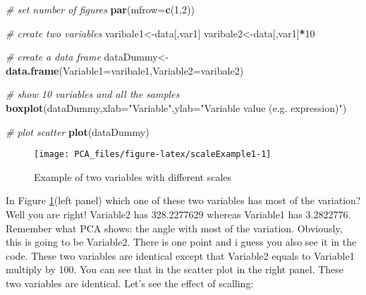 \documentclass[
]{book}
\newenvironment{Shaded}{\begin{snugshade}}{\end{snugshade}}
\newcommand{\CommentTok}[1]{\textcolor[rgb]{0.56,0.35,0.01}{\textit{#1}}}
\newcommand{\DataTypeTok}[1]{\textcolor[rgb]{0.13,0.29,0.53}{#1}}
\newcommand{\DecValTok}[1]{\textcolor[rgb]{0.00,0.00,0.81}{#1}}
\newcommand{\KeywordTok}[1]{\textcolor[rgb]{0.13,0.29,0.53}{\textbf{#1}}}
\newcommand{\NormalTok}[1]{#1}
\newcommand{\OperatorTok}[1]{\textcolor[rgb]{0.81,0.36,0.00}{\textbf{#1}}}
\newcommand{\StringTok}[1]{\textcolor[rgb]{0.31,0.60,0.02}{#1}}
\theoremstyle{definition}
\theoremstyle{definition}
\theoremstyle{definition}
\theoremstyle{remark}
\begin{document}
\begin{Shaded}
\begin{Highlighting}[]
\CommentTok{# set number of figures}
\KeywordTok{par}\NormalTok{(}\DataTypeTok{mfrow=}\KeywordTok{c}\NormalTok{(}\DecValTok{1}\NormalTok{,}\DecValTok{2}\NormalTok{))}

\CommentTok{# create two variables}
\NormalTok{varibale1<-data[,var1]}
\NormalTok{varibale2<-data[,var1]}\OperatorTok{*}\DecValTok{10}

\CommentTok{# create a data frame}
\NormalTok{dataDummy<-}\KeywordTok{data.frame}\NormalTok{(}\DataTypeTok{Variable1=}\NormalTok{varibale1,}\DataTypeTok{Variable2=}\NormalTok{varibale2)}


\CommentTok{# show 10 variables and all the samples}
\KeywordTok{boxplot}\NormalTok{(dataDummy,}\DataTypeTok{xlab=}\StringTok{"Variable"}\NormalTok{,}\DataTypeTok{ylab=}\StringTok{"Variable value (e.g. expression)"}\NormalTok{)}

\CommentTok{# plot scatter}
\KeywordTok{plot}\NormalTok{(dataDummy)}
\end{Highlighting}
\end{Shaded}

\begin{figure}

{\centering \texttt{[image: PCA\_files/figure-latex/scaleExample1-1]} 

}

\caption{Example of two variables with different scales}\label{fig:scaleExample1}
\end{figure}

In Figure \ref{fig:scaleExample1}(left panel) which one of these two variables has most of the variation? Well you are right! Variable2 has 328.2277629 whereas Variable1 has 3.2822776. Remember what PCA shows: the angle with most of the variation. Obviously, this is going to be Variable2. There is one point and i guess you also see it in the code. These two variables are identical except that Variable2 equals to Variable1 multiply by 100. You can see that in the scatter plot in the right panel. These two variables are identical. Let's see the effect of scalling:
\end{document}
